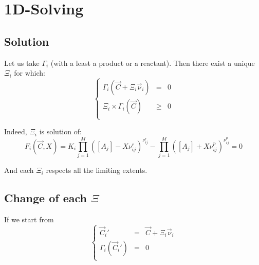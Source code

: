 \documentclass[aps,12pt]{revtex4}
\begin{document}
\section{1D-Solving}

\subsection{Solution}

Let us take $\Gamma_i$ (with a least a product or a reactant).
Then there exist a unique $\Xi_i$ for which:
\begin{equation}
\left\lbrace
\begin{array}{rcl}
	\Gamma_i(\vec{C} + \Xi_i \vec{\nu}_i ) & = & 0\\
	 \Xi_i \times \Gamma_i(\vec{C}) &\geq  &0\\
\end{array}
\right.
\end{equation}
 
Indeed, $\Xi_i$ is solution of:
\begin{equation}
	 F_i(\vec{C},X) =  K_i \prod_{j=1}^{M} \left([A_j] - X \nu^r_{ij}\right)^{\nu^r_{ij}} 
	- \prod_{j=1}^{M} \left([A_j] + X \nu^p_{ij} \right)^{\nu^p_{ij}} = 0
\end{equation} 

And each $\Xi_i$ respects all the limiting extents.



\subsection{Change of each $\Xi$}
If we start from
\begin{equation}
\left\lbrace
\begin{array}{rcl}
	\vec{C}_i' & = & \vec{C} + \Xi_i \vec{\nu}_i\\
	\Gamma_i(\vec{C}_i') & = & 0\\
\end{array}
\right.
\end{equation}
\end{document}
